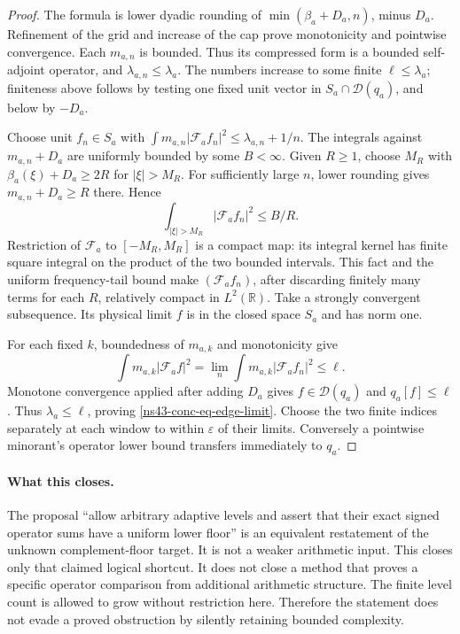 \documentclass[11pt]{article}
\theoremstyle{remark}
\begin{document}
\begin{proof}
The formula is lower dyadic rounding of
$\min(\beta_a+D_a,n)$, minus $D_a$. Refinement of the grid and
increase of the cap prove monotonicity and pointwise convergence.
Each $m_{a,n}$ is bounded. Thus its compressed form is a bounded
self-adjoint operator, and $\lambda_{a,n}\le\lambda_a$.
The numbers increase to some finite $\ell\le\lambda_a$; finiteness
above follows by testing one fixed unit vector in
$S_a\cap\mathcal D(q_a)$, and below by $-D_a$.

Choose unit $f_n\in S_a$ with
$\int m_{a,n}|\mathcal F_af_n|^2\le\lambda_{a,n}+1/n$.
The integrals against $m_{a,n}+D_a$ are uniformly bounded by some
$B<\infty$. Given $R\ge1$, choose $M_R$ with
$\beta_a(\xi)+D_a\ge2R$ for $|\xi|>M_R$.
For sufficiently large $n$, lower rounding gives
$m_{a,n}+D_a\ge R$ there. Hence
\[
 \int_{|\xi|>M_R}|\mathcal F_af_n|^2\le B/R.
\]
Restriction of $\mathcal F_a$ to $[-M_R,M_R]$ is a compact map:
its integral kernel has finite square integral on the product of
the two bounded intervals. This fact and the uniform frequency-tail
bound make $(\mathcal F_af_n)$, after discarding finitely many
terms for each $R$, relatively compact in $L^2(\mathbb R)$.
Take a strongly convergent subsequence. Its physical limit $f$ is
in the closed space $S_a$ and has norm one.

For each fixed $k$, boundedness of $m_{a,k}$ and monotonicity give
\[
 \int m_{a,k}|\mathcal F_af|^2
 =\lim_n\int m_{a,k}|\mathcal F_af_n|^2\le\ell.
\]
Monotone convergence applied after adding $D_a$ gives
$f\in\mathcal D(q_a)$ and $q_a[f]\le\ell$.
Thus $\lambda_a\le\ell$, proving \eqref{ns43-conc-eq-edge-limit}.
Choose the two finite indices separately at each window to within
$\varepsilon$ of their limits. Conversely a pointwise minorant's
operator lower bound transfers immediately to $q_a$.
\end{proof}

\paragraph{What this closes.}
The proposal ``allow arbitrary adaptive levels and assert that their
exact signed operator sums have a uniform lower floor'' is an
equivalent restatement of the unknown complement-floor target.
It is not a weaker arithmetic input. This closes only that claimed
logical shortcut. It does not close a method that proves a specific
operator comparison from additional arithmetic structure.
The finite level count is allowed to grow without restriction here.
Therefore the statement does not evade a proved obstruction by
silently retaining bounded complexity.
\end{document}
